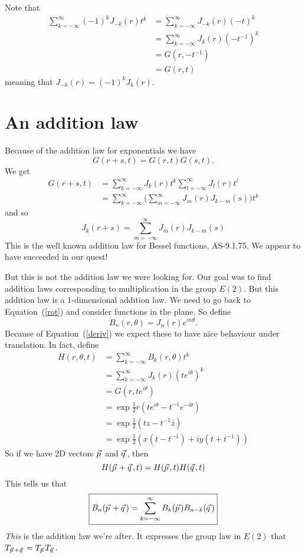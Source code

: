 \documentclass{article}
\newcommand\myvec[1]{\vec{#1}\hspace{0.5mm}}
\begin{document}
Note that
\begin{align*}
\sum_{k=-\infty}^\infty (-1)^kJ_{-k}(r)t^k
&= \sum_{k=-\infty}^\infty J_{-k}(r)(-t)^k \\
&= \sum_{k=-\infty}^\infty J_k(r)(-t^{-1})^k \\
&= G(r,-t^{-1}) \\
&= G(r,t)
\end{align*}
meaning that $J_{-k}(r) = (-1)^kJ_{k}(r)$.

\section{An addition law}
Because of the addition law for exponentials we have
\[
G(r+s,t) = G(r,t)G(s,t).
\]
We get
\begin{align*}
G(r+s,t) &= \sum_{k=-\infty}^\infty J_k(r)t^k\sum_{l=-\infty}^\infty J_l(r)t^l\\
&= \sum_{k=-\infty}^\infty \Big(\sum_{m=-\infty}^\infty J_{m}(r)J_{k-m}(s) \Big) t^k
\end{align*}
and so
\[
J_k(r+s) = \sum_{m=-\infty}^\infty J_{m}(r)J_{k-m}(s)
\]
This is the well known addition law for Bessel functions, AS-9.1.75.
We appear to have succeeded in our quest!

But this is not the addition law we were looking for.
Our goal was to find addition laws corresponding to multiplication in the group $E(2)$.
But this addition law is a 1-dimensional addition law.
We need to go back to Equation~(\ref{rot}) and consider functions in the plane.
So define
\[
\boxed{B_n(r,\theta) = J_n(r)e^{in\theta}}.
\]
Because of Equation~(\ref{deriv}) we expect these to have nice behaviour under translation.
In fact, define
\begin{align*}
H(r,\theta,t) &= \sum_{k=-\infty}^\infty B_k(r,\theta)t^k \\
&= \sum_{k=-\infty}^\infty J_k(r)(te^{i\theta})^k \\
&= G(r,te^{i\theta}) \\
&= \exp\frac{1}{2}r(te^{i\theta}-t^{-1}e^{-i\theta}) \\
&= \exp\frac{1}{2}(tz-t^{-1}\bar{z}) \\
&= \exp\frac{1}{2}(x(t-t^{-1})+iy(t+t^{-1}))
\end{align*}
So if we have 2D vectors $\myvec{p}$ and $\myvec{q}$, then
\[
H(\myvec{p}+\myvec{q},t) = H(\myvec{p},t)H(\myvec{q},t)
\]
This tells us that
\begin{equation}
\boxed{B_n(\myvec{p}+\myvec{q}) = \sum_{k=-\infty}^\infty B_k(\myvec{p})B_{n-k}(\myvec{q})}\label{addition}
\end{equation}
\textit{This} is the addition law we're after.
It expresses the group law in $E(2)$ that $T_{\myvec{p}+\myvec{q}}=T_{\myvec{p}}T_{\myvec{q}}$.
\end{document}
